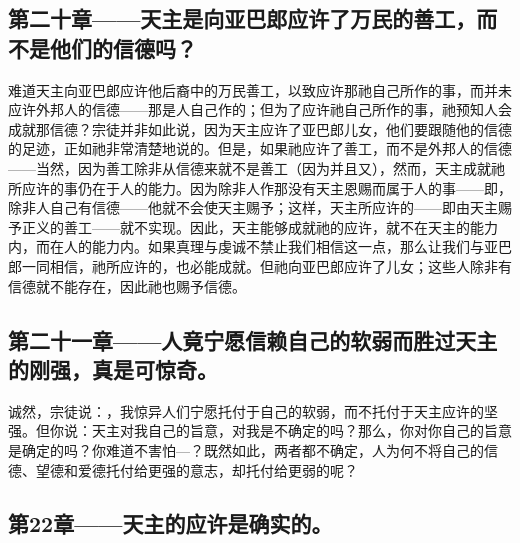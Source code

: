 
\subsection{第二十章——天主是向亚巴郎应许了万民的善工，而不是他们的信德吗？}

难道天主向亚巴郎应许他后裔中的万民善工，以致应许那祂自己所作的事，而并未应许外邦人的信德——那是人自己作的；但为了应许祂自己所作的事，祂预知人会成就那信德？宗徒并非如此说，因为天主应许了亚巴郎儿女，他们要跟随他的信德的足迹，正如祂非常清楚地说的。但是，如果祂应许了善工，而不是外邦人的信德——当然，因为善工除非从信德来就不是善工（因为并且又），然而，天主成就祂所应许的事仍在于人的能力。因为除非人作那没有天主恩赐而属于人的事——即，除非人自己有信德——他就不会使天主赐予；这样，天主所应许的——即由天主赐予正义的善工——就不实现。因此，天主能够成就祂的应许，就不在天主的能力内，而在人的能力内。如果真理与虔诚不禁止我们相信这一点，那么让我们与亚巴郎一同相信，祂所应许的，也必能成就。但祂向亚巴郎应许了儿女；这些人除非有信德就不能存在，因此祂也赐予信德。\par


\subsection{第二十一章——人竟宁愿信赖自己的软弱而胜过天主的刚强，真是可惊奇。}

诚然，宗徒说：，我惊异人们宁愿托付于自己的软弱，而不托付于天主应许的坚强。但你说：天主对我自己的旨意，对我是不确定的吗？那么，你对你自己的旨意是确定的吗？你难道不害怕—？既然如此，两者都不确定，人为何不将自己的信德、望德和爱德托付给更强的意志，却托付给更弱的呢？\par


\subsection{第22章——天主的应许是确实的。}

